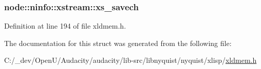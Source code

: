\subsubsection[{\texorpdfstring{xs\+\_\+savech}{xs_savech}}]{ node\+::ninfo\+::xstream\+::xs\+\_\+savech}\hypertarget{structnode_1_1ninfo_1_1xstream_a5b0bfb01d3bf01b90f51e6a9115ad3d9}{}\label{structnode_1_1ninfo_1_1xstream_a5b0bfb01d3bf01b90f51e6a9115ad3d9}


Definition at line 194 of file xldmem.\+h.



The documentation for this struct was generated from the following file\+:\begin{DoxyCompactItemize}
\item 
C\+:/\+\_\+dev/\+Open\+U/\+Audacity/audacity/lib-\/src/libnyquist/nyquist/xlisp/\hyperlink{xldmem_8h}{xldmem.\+h}\end{DoxyCompactItemize}
